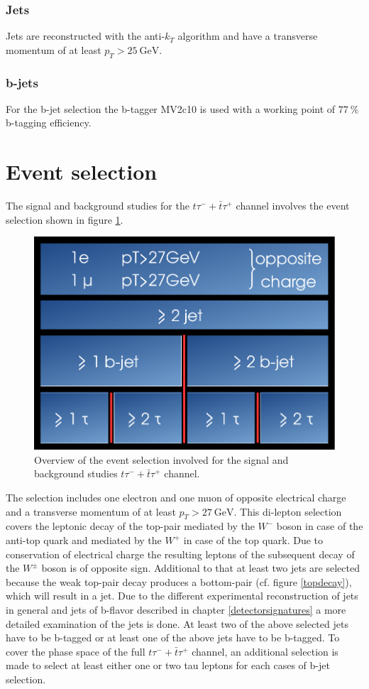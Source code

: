 \subsubsection*{Jets}
Jets are reconstructed with the anti-$k_T$ algorithm and have a transverse momentum of at least $p_T>\SI{25}{\giga\electronvolt}$. 
\subsubsection*{b-jets}\label{physObj:bjet}
For the b-jet selection the b-tagger MV2c10 is used with a working point of $\SI{77}{\percent}$ b-tagging efficiency.
\section{Event selection}\label{eventselection}
The signal and background studies for the $t\tau^{-}+\bar{t}\tau^{+}$ channel involves the event selection shown in figure \ref{selection}.\newline
%
\begin{figure}[htbp]                                 
 \begin{center}                                       
  \includegraphics[width=0.45\linewidth]{figures/selection.pdf} 
   \caption[Overview of the event selection.]{Overview of the event selection involved for the signal and background studies $t\tau^{-}+\bar{t}\tau^{+}$ channel.}
  \label{selection}                                    
 \end{center}
\end{figure}
%
The selection includes one electron and one muon of opposite electrical charge and a transverse momentum of at least $p_T>\SI{27}{\giga\electronvolt}$. This di-lepton selection covers the leptonic decay of the top-pair mediated by the $W^-$ boson in case of the anti-top quark and mediated by the $W^+$ in case of the top quark. Due to conservation of electrical charge the resulting leptons of the subsequent decay of the $W^\pm$ boson is of opposite sign. Additional to that at least two jets are selected because the weak top-pair decay produces a bottom-pair (cf. figure \ref{topdecay}), which will result in a jet. Due to the different experimental reconstruction of jets in general and jets of b-flavor described in chapter \ref{detectorsignatures} a more detailed examination of the jets is done. At least two of the above selected jets have to be b-tagged or at least one of the above jets have to be b-tagged. To cover the phase space of the full $t\tau^{-}+\bar{t}\tau^{+}$ channel, an additional selection is made to select at least either one or two tau leptons for each cases of b-jet selection.    

